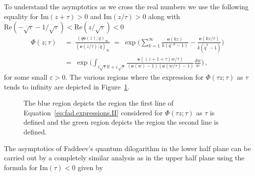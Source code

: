 \documentclass[12pt,reqno]{amsart}
\theoremstyle{definition}
\def\BR{\mathbb R}
\def\Re{\mathrm{Re}}
\def\Im{\mathrm{Im}}
\def\be{\begin{equation}}
\def\ee{\end{equation}}
\def\e{\mathbf e}
\renewcommand{\=}{\;=\;}
\newcommand{\tq}{\widetilde q}
\begin{document}
To understand the asymptotics as we cross the real numbers we use the following equality for $\Im(z+\tau)>0$ and $\Im(z/\tau)>0$ along with $\Re(-\sqrt{\tau}-1/\sqrt{\tau})<\Re(z/\sqrt{\tau})<0$
\be\label{eq:fad.expressions.II}
\begin{aligned}
  \Phi(z;\tau)
  &\=
  \frac{(q\e(z);q)_{\infty}}{(\e(z/\tau);\tq)_{\infty}}
  \=
  \exp\Big(
    \sum_{k=1}^{\infty}
    \frac{\e(kz)}{k(q^{-k}-1)}
    -\frac{\e(kz/\tau)}{k(\tq^k-1)}
  \Big)\\
  &\=
  \exp\Big(
    \int_{i\sqrt{\tau}\BR+\varepsilon\sqrt{\tau}}\frac{\e((z+1+\tau)w/\tau)}{(\e(w)-1)(\e(w/\tau)-1)}
    \frac{dw}{w}
  \Big)\,,
\end{aligned}
\ee
for some small $\varepsilon>0$. 
The various regions where the expression for $\Phi(\tau z;\tau)$ as $\tau$ tends to infinity are depicted in Figure~\ref{fig:fad.qpoch.overlap}.
\begin{center}
\begin{figure}
\caption{The blue region depicts the region the first line of Equation~\eqref{eq:fad.expressions.II} considered for $\Phi(\tau z;\tau)$ as $\tau$ is defined and the green region depicts the region the second line is defined.}
\label{fig:fad.qpoch.overlap}
\end{figure}
\end{center}
The asymptotics of Faddeev's quantum dilogarithm in the lower half plane can be carried out by a completely similar analysis as in the upper half plane using the formula for $\Im(\tau)<0$ given by
\end{document}
